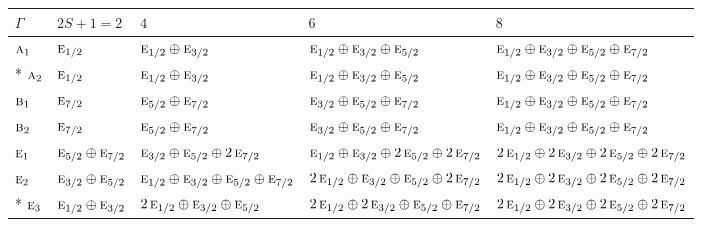 \documentclass[10pt,a4paper]{article}
\numberwithin{equation}{section}
\newcommand{\irr}[1]{\text{\normalfont\scshape #1}}
\begin{document}
{\small\setlength{\tabcolsep}{3pt}\begin{longtable}{@{}l>{\RaggedRight\arraybackslash}p{}>{\RaggedRight\arraybackslash}p{}>{\RaggedRight\arraybackslash}p{}>{\RaggedRight\arraybackslash}p{}@{}}\toprule
$\Gamma$ & $2S + 1 = 2$ & $4$ & $6$ & $8$\\\midrule\endhead
\bottomrule\endfoot\endlastfoot
$\irr{a}_{1}$ & $\irr{e}_{1/2}$ & $\irr{e}_{1/2}\oplus \irr{e}_{3/2}$ & $\irr{e}_{1/2}\oplus \irr{e}_{3/2}\oplus \irr{e}_{5/2}$ & $\irr{e}_{1/2}\oplus \irr{e}_{3/2}\oplus \irr{e}_{5/2}\oplus \irr{e}_{7/2}$\\*
$\irr{a}_{2}$ & $\irr{e}_{1/2}$ & $\irr{e}_{1/2}\oplus \irr{e}_{3/2}$ & $\irr{e}_{1/2}\oplus \irr{e}_{3/2}\oplus \irr{e}_{5/2}$ & $\irr{e}_{1/2}\oplus \irr{e}_{3/2}\oplus \irr{e}_{5/2}\oplus \irr{e}_{7/2}$\\
$\irr{b}_{1}$ & $\irr{e}_{7/2}$ & $\irr{e}_{5/2}\oplus \irr{e}_{7/2}$ & $\irr{e}_{3/2}\oplus \irr{e}_{5/2}\oplus \irr{e}_{7/2}$ & $\irr{e}_{1/2}\oplus \irr{e}_{3/2}\oplus \irr{e}_{5/2}\oplus \irr{e}_{7/2}$\\
$\irr{b}_{2}$ & $\irr{e}_{7/2}$ & $\irr{e}_{5/2}\oplus \irr{e}_{7/2}$ & $\irr{e}_{3/2}\oplus \irr{e}_{5/2}\oplus \irr{e}_{7/2}$ & $\irr{e}_{1/2}\oplus \irr{e}_{3/2}\oplus \irr{e}_{5/2}\oplus \irr{e}_{7/2}$\\
$\irr{e}_{1}$ & $\irr{e}_{5/2}\oplus \irr{e}_{7/2}$ & $\irr{e}_{3/2}\oplus \irr{e}_{5/2}\oplus 2\,\irr{e}_{7/2}$ & $\irr{e}_{1/2}\oplus \irr{e}_{3/2}\oplus 2\,\irr{e}_{5/2}\oplus 2\,\irr{e}_{7/2}$ & $2\,\irr{e}_{1/2}\oplus 2\,\irr{e}_{3/2}\oplus 2\,\irr{e}_{5/2}\oplus 2\,\irr{e}_{7/2}$\\
$\irr{e}_{2}$ & $\irr{e}_{3/2}\oplus \irr{e}_{5/2}$ & $\irr{e}_{1/2}\oplus \irr{e}_{3/2}\oplus \irr{e}_{5/2}\oplus \irr{e}_{7/2}$ & $2\,\irr{e}_{1/2}\oplus \irr{e}_{3/2}\oplus \irr{e}_{5/2}\oplus 2\,\irr{e}_{7/2}$ & $2\,\irr{e}_{1/2}\oplus 2\,\irr{e}_{3/2}\oplus 2\,\irr{e}_{5/2}\oplus 2\,\irr{e}_{7/2}$\\*
$\irr{e}_{3}$ & $\irr{e}_{1/2}\oplus \irr{e}_{3/2}$ & $2\,\irr{e}_{1/2}\oplus \irr{e}_{3/2}\oplus \irr{e}_{5/2}$ & $2\,\irr{e}_{1/2}\oplus 2\,\irr{e}_{3/2}\oplus \irr{e}_{5/2}\oplus \irr{e}_{7/2}$ & $2\,\irr{e}_{1/2}\oplus 2\,\irr{e}_{3/2}\oplus 2\,\irr{e}_{5/2}\oplus 2\,\irr{e}_{7/2}$\\
\bottomrule\end{longtable}}
\end{document}

